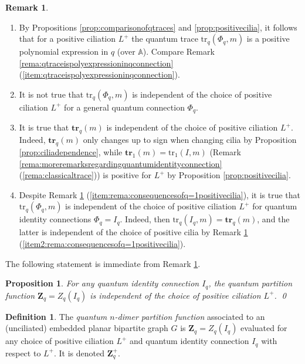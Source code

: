 \documentclass[12pt, reqno]{amsart}
\newtheorem{prop}[theo]{Proposition}
\theoremstyle{definition}
\newtheorem{defi}[theo]{Definition}
\newtheorem{rema}[theo]{Remark}
\newcommand{\Zqc}{Z_q}%
\newcommand{\Zq}{\mathbf{Z}_q}%
\newcommand{\trqc}{\mathrm{tr}_q}%
\newcommand{\trq}{\mathbf{tr}_q}%
\begin{document}
\begin{rema}\label{rema:consequencesofq=1positivecilia}
\begin{enumerate}
\item\label{item3:rema:consequencesofq=1positivecilia}
By Propositions \ref{prop:comparisonofqtraces} and \ref{prop:positivecilia}, it follows that for a positive ciliation $L^+$ the quantum trace $\trqc(\Phi_q,m)$ is a positive polynomial expression in $q$ (over $\mathbb{A}$).  Compare Remark \ref{rema:qtraceispolyexpressioninqconnection}
(\ref{item:qtraceispolyexpressioninqconnection}).
\item\label{item:rema:consequencesofq=1positivecilia}
It is not true that $\trqc(\Phi_q,m)$ is independent of the choice of positive ciliation $L^+$ for a general quantum connection $\Phi_q$.  
\item\label{item2:rema:consequencesofq=1positivecilia}
It is true that $\trq(m)$ is independent of the choice of positive ciliation $L^+$.  Indeed, $\trq(m)$ only changes up to sign when changing cilia by Proposition \ref{prop:ciliadependence}, while $\mathbf{tr}_1(m)=\mathrm{tr}_1(I,m)$ (Remark \ref{rema:moreremarksregardingquantumidentityconnection} (\ref{rema:classicaltrace})) is positive for $L^+$ by Proposition \ref{prop:positivecilia}.  
\item
Despite Remark \ref{rema:consequencesofq=1positivecilia} (\ref{item:rema:consequencesofq=1positivecilia}), it is true that $\trqc(\Phi_q,m)$ is independent of the choice of positive ciliation $L^+$ for quantum identity connections $\Phi_q=I_q$.  Indeed, then $\trqc(I_q,m)=\trq(m)$, and the latter is independent of the choice of positive cilia by Remark \ref{rema:consequencesofq=1positivecilia} (\ref{item2:rema:consequencesofq=1positivecilia}).  
\end{enumerate}
\end{rema}

The following statement is immediate from Remark \ref{rema:consequencesofq=1positivecilia}.

\begin{prop}
For any quantum identity connection $I_q$, the quantum partition function $\Zq=\Zqc(I_q)$ is independent of the choice of positive ciliation $L^+$.  
\qed\end{prop}

\begin{defi}\label{defi:positivequantumpartitionfunction}
The \emph{quantum $n$-dimer partition function} associated to an (unciliated) embedded planar bipartite graph $G$ is $\Zq=\Zqc(I_q)$ evaluated for any choice of positive ciliation $L^+$ and quantum identity connection $I_q$ with respect to $L^+$.  It is denoted $\Zq^+$. 
\end{defi}
\end{document}
